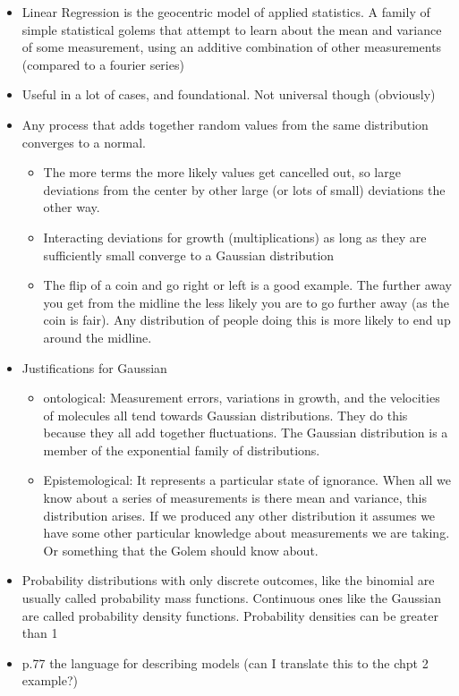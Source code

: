 \documentclass[11pt]{article}
\begin{document}
\begin{itemize}
\tightlist
\item
  Linear Regression is the geocentric model of applied statistics. A
  family of simple statistical golems that attempt to learn about the
  mean and variance of some measurement, using an additive combination
  of other measurements (compared to a fourier series)
\item
  Useful in a lot of cases, and foundational. Not universal though
  (obviously)
\item
  Any process that adds together random values from the same
  distribution converges to a normal.

  \begin{itemize}
  \tightlist
  \item
    The more terms the more likely values get cancelled out, so large
    deviations from the center by other large (or lots of small)
    deviations the other way.
  \item
    Interacting deviations for growth (multiplications) as long as they
    are sufficiently small converge to a Gaussian distribution
  \item
    The flip of a coin and go right or left is a good example. The
    further away you get from the midline the less likely you are to go
    further away (as the coin is fair). Any distribution of people doing
    this is more likely to end up around the midline.
  \end{itemize}
\item
  Justifications for Gaussian

  \begin{itemize}
  \tightlist
  \item
    ontological: Measurement errors, variations in growth, and the
    velocities of molecules all tend towards Gaussian distributions.
    They do this because they all add together fluctuations. The
    Gaussian distribution is a member of the exponential family of
    distributions.
  \item
    Epistemological: It represents a particular state of ignorance. When
    all we know about a series of measurements is there mean and
    variance, this distribution arises. If we produced any other
    distribution it assumes we have some other particular knowledge
    about measurements we are taking. Or something that the Golem should
    know about.
  \end{itemize}
\item
  Probability distributions with only discrete outcomes, like the
  binomial are usually called probability mass functions. Continuous
  ones like the Gaussian are called probability density functions.
  Probability densities can be greater than 1
\item
  p.77 the language for describing models (can I translate this to the
  chpt 2 example?)


\end{itemize}
\end{document}
